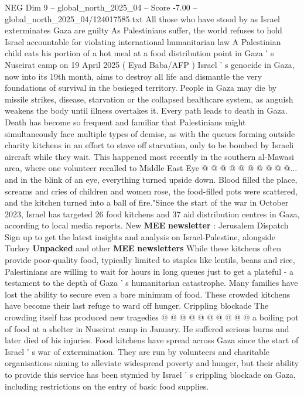\begin{textsample}{NEG Dim 9 – global\_north\_2025\_04 – Score -7.00 – global\_north\_2025\_04/124017585.txt}  \label{ex:f9_neg_026}
All those who have stood by as Israel exterminates Gaza are guilty As Palestinians suffer, the world refuses to hold Israel accountable for violating international humanitarian law A Palestinian child eats his portion of a hot meal at a food distribution point in Gaza ' s Nuseirat camp on 19 April 2025 ( Eyad Baba/AFP ) Israel ' s genocide in Gaza, now into its 19th month, aims to destroy all life and dismantle the very foundations of survival in the besieged territory.
People in Gaza may die by missile strikes, disease, starvation or the collapsed healthcare system, as anguish weakens the body until illness overtakes it.
Every path leads to death in Gaza.
Death has become so frequent and familiar that Palestinians might simultaneously face multiple types of demise, as with the queues forming outside charity kitchens in an effort to stave off starvation, only to be bombed by Israeli aircraft while they wait.
This happened most recently in the southern al-Mawasi area, where one volunteer recalled to Middle East Eye @ @ @ @ @ @ @ @ @ @... and in the blink of an eye, everything turned upside down.
Blood filled the place, screams and cries of children and women rose, the food-filled pots were scattered, and the kitchen turned into a ball of fire."Since the start of the war in October 2023, Israel has targeted 26 food kitchens and 37 aid distribution centres in Gaza, according to local media reports.
New \textbf{MEE} \textbf{newsletter} : Jerusalem Dispatch Sign up to get the latest insights and analysis on Israel-Palestine, alongside Turkey \textbf{Unpacked} and other \textbf{MEE} \textbf{newsletters} While these kitchens often provide poor-quality food, typically limited to staples like lentils, beans and rice, Palestinians are willing to wait for hours in long queues just to get a plateful - a testament to the depth of Gaza ' s humanitarian catastrophe.
Many families have lost the ability to secure even a bare minimum of food.
These crowded kitchens have become their last refuge to ward off hunger.
Crippling blockade The crowding itself has produced new tragedies @ @ @ @ @ @ @ @ @ @ a boiling pot of food at a shelter in Nuseirat camp in January.
He suffered serious burns and later died of his injuries.
Food kitchens have spread across Gaza since the start of Israel ' s war of extermination.
They are run by volunteers and charitable organisations aiming to alleviate widespread poverty and hunger, but their ability to provide this service has been stymied by Israel ' s crippling blockade on Gaza, including restrictions on the entry of basic food supplies.

\end{textsample}
